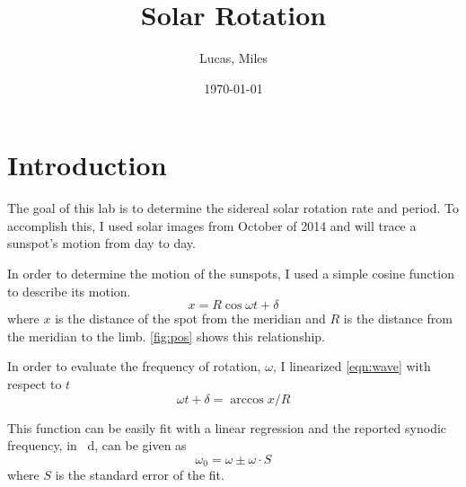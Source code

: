 \documentclass[%
aip,
jmp,
reprint,
floatfix,
]{revtex4-1}
\begin{document}
	\title[Solar Rotation]{Solar Rotation}

	\author{Lucas, Miles}

	\date{\today}



	\begin{abstract}
	
	\end{abstract}

	\maketitle


	\section{Introduction}
	The goal of this lab is to determine the sidereal solar rotation rate and period. To accomplish this, I used solar images from October of 2014 and will trace a sunspot's motion from day to day. 
	
	In order to determine the motion of the sunspots, I used a simple cosine function to describe its motion.
	\begin{equation}
	x = R \cos{\omega t + \delta}
	\label{eqn:wave}
	\end{equation}
	where $x$ is the distance of the spot from the meridian and $R$ is the distance from the meridian to the limb. \autoref{fig:pos} shows this relationship.
	
	In order to evaluate the frequency of rotation, $\omega$, I linearized \autoref{eqn:wave} with respect to $t$
	\begin{equation}
	\omega t + \delta = \arccos{x/R}
	\label{eqn:line}
	\end{equation}
	
	This function can be easily fit with a linear regression and the reported synodic frequency, in \si{\per \day}, can be given as 
	\begin{equation}
	\omega_0 = \omega \pm \omega \cdot S
	\label{eqn:err}
	\end{equation}
	where $S$ is the standard error of the fit.
	
\end{document}
